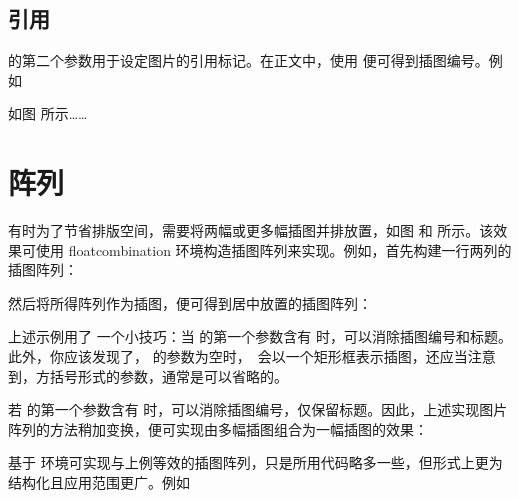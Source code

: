 \subsection{引用}

\type{\placefigure} 的第二个参数用于设定图片的引用标记。在正文中，使用 \type{\in[...]} 便可得到插图编号。例如

\starttyping[option=TEX]
如图 \in[Hilbert 曲线] 所示……

\stoptyping
{}

\section[figure-matrix]{阵列}

有时为了节省排版空间，需要将两幅或更多幅插图并排放置，如图 \in[win-r] 和  所示。该效果可使用 floatcombination 环境构造插图阵列来实现。例如，首先构建一行两列的插图阵列：

\starttyping[option=TEX]
\startfloatcombination[nx=2,ny=1]
\placefigure{}{}
\placefigure{}{}
\stopfloatcombination
\stoptyping
{}

\noindent 然后将所得阵列作为插图，便可得到居中放置的插图阵列：

\starttyping[option=TEX]
\placefigure[none][]{}{
  \startfloatcombination[nx=2,ny=1]
  \placefigure{}{}
  \placefigure{}{}
  \stopfloatcombination
}
\stoptyping
{}

上述示例用了 \type{\placefigure} 一个小技巧：当 \type{\placefigure} 的第一个参数含有  时，可以消除插图编号和标题。此外，你应该发现了，\type{\placefigure} 的参数为空时，\ConTeXt\ 会以一个矩形框表示插图，还应当注意到，方括号形式的参数，通常是可以省略的。

若 \type{\placefigure} 的第一个参数含有  时，可以消除插图编号，仅保留标题。因此，上述实现图片阵列的方法稍加变换，便可实现由多幅插图组合为一幅插图的效果：

\starttyping[option=TEX]
\stoptyping
{}

基于  环境可实现与上例等效的插图阵列，只是所用代码略多一些，但形式上更为结构化且应用范围更广。例如

